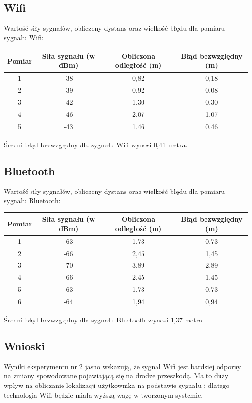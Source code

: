 \subsection{Wifi}
Wartość siły sygnałów, obliczony dystans oraz wielkość błędu dla pomiaru sygnału Wifi:
\begin{center}
	\begin{minipage}{\linewidth}
		\begin{tabular}{|c|c|c|c|}
			\hline 
			Pomiar & Siła sygnału (w dBm) & Obliczona odległość (m) & Błąd bezwzględny (m)\\ 
			\hline 
			1 & -38 & 0,82 & 0,18 \\ 
			\hline 
			2 & -39 & 0,92 & 0,08 \\ 
			\hline 
			3 & -42 & 1,30 & 0,30 \\ 
			\hline 
			4 & -46 & 2,07 & 1,07 \\ 
			\hline 
			5 & -43 & 1,46 & 0,46 \\ 
			\hline
		\end{tabular} 
	\end{minipage} 
\end{center}
Średni błąd bezwzględny dla sygnału Wifi wynosi 0,41 metra.\\
\subsection{Bluetooth}
Wartość siły sygnałów, obliczony dystans oraz wielkość błędu dla pomiaru sygnału Bluetooth:
 \begin{center}
 	\begin{minipage}{\linewidth}
 		\begin{tabular}{|c|c|c|c|}
 			\hline 
 			Pomiar & Siła sygnału (w dBm) & Obliczona odległość (m) & Błąd bezwzględny (m)\\ 
 			\hline 
 			1 & -63 & 1,73 & 0,73 \\ 
 			\hline 
 			2 & -66 & 2,45 & 1,45 \\ 
 			\hline 
 			3 & -70 & 3,89 & 2,89 \\ 
 			\hline 
 			4 & -66 & 2,45 & 1,45 \\ 
 			\hline 
 			5 & -63 & 1,73 & 0,73 \\
 			\hline
 			6 & -64 & 1,94 & 0,94 \\
 			\hline 
 		\end{tabular} 
 	\end{minipage} 
 \end{center}
Średni błąd bezwzględny dla sygnału Bluetooth wynosi 1,37 metra.
\subsection{Wnioski}
Wyniki eksperymentu nr 2 jasno wskazują, że sygnał Wifi jest bardziej odporny na zmiany spowodowane pojawiającą się na drodze przeszkodą. Ma to duży wpływ na obliczanie lokalizacji użytkownika na podstawie sygnału i dlatego technologia Wifi będzie miała wyższą wagę w tworzonym systemie. 